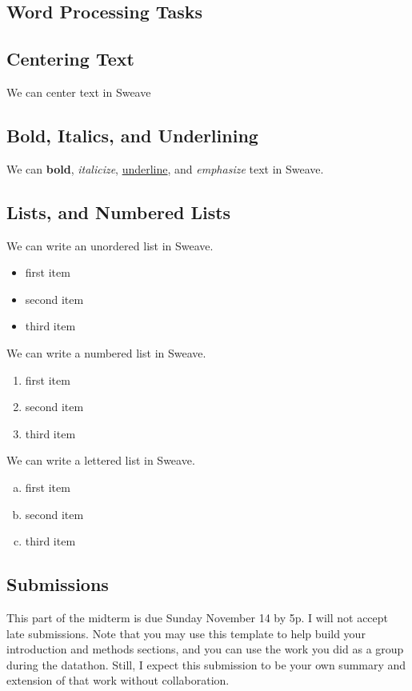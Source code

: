 \documentclass{article}\usepackage[]{graphicx}\usepackage[]{xcolor}
\begin{document}
\begin{multicols}{2}
\section{Word Processing Tasks}
\subsection{Centering Text}
\centerline{We can center text in Sweave}
\vspace{0.75cm}
\subsection{Bold, Italics, and Underlining}
We can \textbf{bold}, \textit{italicize}, \underline{underline}, and \emph{emphasize} text in Sweave.\\
\subsection{Lists, and Numbered Lists}
We can write an unordered list in Sweave.
\begin{itemize}\itemsep0em
\item first item
\item second item
\item third item
\end{itemize}
We can write a numbered list in Sweave.
\begin{enumerate}[1.]\itemsep0em
\item first item
\item second item
\item third item
\end{enumerate}
We can write a lettered list in Sweave.
\begin{enumerate}[a.]\itemsep0em
\item first item
\item second item
\item third item
\end{enumerate}

\subsection{Submissions}
This part of the midterm is due Sunday November 14 by 5p. I will not accept late submissions. Note that you may use this template to help build your introduction and methods sections, and you can use the work you did as a group during the datathon. Still, I expect this submission to be your own summary and extension of that work without collaboration.


\end{multicols}
\end{document}
